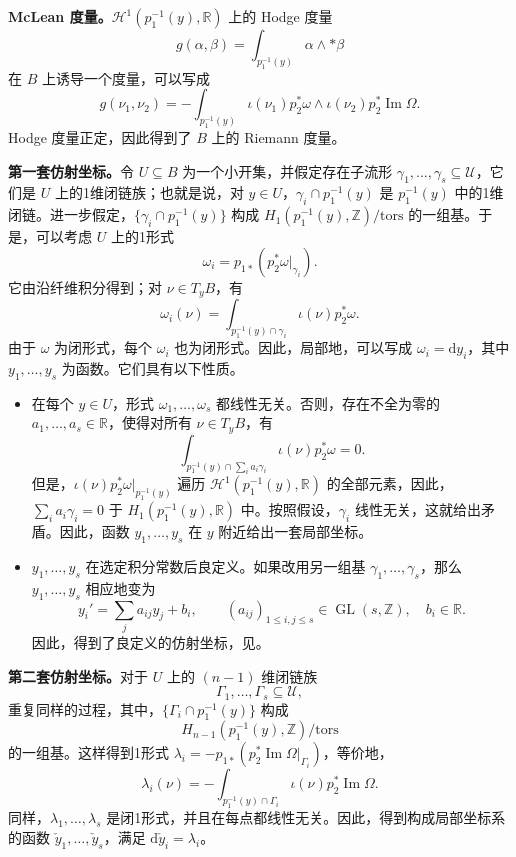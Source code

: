 \textbf{McLean 度量。}$\mathcal H^1(p_1^{-1}(y),\mathbb R)$ 上的 Hodge 度量
\[
g(\alpha,\beta)=\int_{p_1^{-1}(y)}\alpha\wedge*\beta
\]
在 $B$ 上诱导一个度量，可以写成
\[
g(\nu_1,\nu_2)=-\int_{p_1^{-1}(y)}
\iota(\nu_1)p_2^*\omega\wedge\iota(\nu_2)p_2^*\operatorname{Im}\Omega.
\]
Hodge 度量正定，因此得到了 $B$ 上的 Riemann 度量。

\textbf{第一套仿射坐标。}令 $U\subseteq B$ 为一个小开集，并假定存在子流形 $\gamma_1,\ldots,\gamma_s\subseteq\mathcal U$，它们是 $U$ 上的1维闭链族；也就是说，对 $y\in U$，$\gamma_i\cap p_1^{-1}(y)$ 是 $p_1^{-1}(y)$ 中的1维闭链。进一步假定，$\{\gamma_i\cap p_1^{-1}(y)\}$ 构成 $H_1(p_1^{-1}(y),\mathbb Z)/\mathrm{tors}$ 的一组基。于是，可以考虑 $U$ 上的1形式
\[
\omega_i=p_{1*}(p_2^*\omega|_{\gamma_i}).
\]
它由沿纤维积分得到；对 $\nu\in T_yB$，有
\[
\omega_i(\nu)=\int_{p_1^{-1}(y)\cap\gamma_i}\iota(\nu)p_2^*\omega.
\]
由于 $\omega$ 为闭形式，每个 $\omega_i$ 也为闭形式。因此，局部地，可以写成 $\omega_i=\mathrm dy_i$，其中 $y_1,\ldots,y_s$ 为函数。它们具有以下性质。
\begin{itemize}
\item 在每个 $y\in U$，形式 $\omega_1,\ldots,\omega_s$ 都线性无关。否则，存在不全为零的 $a_1,\ldots,a_s\in\mathbb R$，使得对所有 $\nu\in T_yB$，有
\[
\int_{p_1^{-1}(y)\cap\sum_i a_i\gamma_i}\iota(\nu)p_2^*\omega=0.
\]
但是，$\iota(\nu)p_2^*\omega|_{p_1^{-1}(y)}$ 遍历 $\mathcal H^1(p_1^{-1}(y),\mathbb R)$ 的全部元素，因此，$\sum_i a_i\gamma_i=0$ 于 $H_1(p_1^{-1}(y),\mathbb R)$ 中。按照假设，$\gamma_i$ 线性无关，这就给出矛盾。因此，函数 $y_1,\ldots,y_s$ 在 $y$ 附近给出一套局部坐标。
\item $y_1,\ldots,y_s$ 在选定积分常数后良定义。如果改用另一组基 $\gamma_1,\ldots,\gamma_s$，那么 $y_1,\ldots,y_s$ 相应地变为
\[
y_i'=\sum_j a_{ij}y_j+b_i,
\qquad (a_{ij})_{1\leq i,j\leq s}\in\operatorname{GL}(s,\mathbb Z),
\quad b_i\in\mathbb R.
\]
因此，得到了良定义的仿射坐标，见。
\end{itemize}

\textbf{第二套仿射坐标。}对于 $U$ 上的 $(n-1)$ 维闭链族
\[
\Gamma_1,\ldots,\Gamma_s\subseteq\mathcal U,
\]
重复同样的过程，其中，$\{\Gamma_i\cap p_1^{-1}(y)\}$ 构成
\[
H_{n-1}(p_1^{-1}(y),\mathbb Z)/\mathrm{tors}
\]
的一组基。这样得到1形式 $\lambda_i=-p_{1*}(p_2^*\operatorname{Im}\Omega|_{\Gamma_i})$，等价地，
\[
\lambda_i(\nu)=-\int_{p_1^{-1}(y)\cap\Gamma_i}
\iota(\nu)p_2^*\operatorname{Im}\Omega.
\]
同样，$\lambda_1,\ldots,\lambda_s$ 是闭1形式，并且在每点都线性无关。因此，得到构成局部坐标系的函数 $\check y_1,\ldots,\check y_s$，满足 $\mathrm d\check y_i=\lambda_i$。

